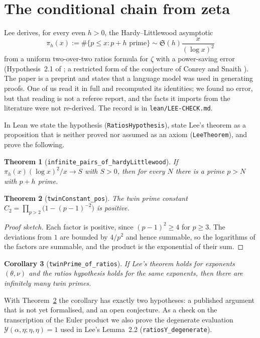 \documentclass[11pt]{article}
\newtheorem{theorem}{Theorem}
\newtheorem{corollary}[theorem]{Corollary}
\theoremstyle{definition}
\theoremstyle{remark}
\newcommand{\lean}[1]{\texttt{#1}}
\begin{document}
\section{The conditional chain from zeta}\label{sec:chain}

Lee \cite{lee} derives, for every even $h>0$, the Hardy--Littlewood asymptotic
\[
\pi_h(x):=\#\{p\le x: p+h \text{ prime}\}\sim\mathfrak{S}(h)\frac{x}{(\log x)^2}
\]
from a uniform two-over-two ratios formula for $\zeta$ with a power-saving
error (Hypothesis~2.1 of \cite{lee}; a restricted form of the conjecture of
Conrey and Snaith \cite{conreysnaith}). The paper is a preprint and states that
a language model was used in generating proofs. One of us read it in full and
recomputed its identities; we found no error, but that reading is not a referee
report, and the facts it imports from the literature were not re-derived. The
record is in \lean{lean/LEE-CHECK.md}.

In Lean we state the hypothesis (\lean{RatiosHypothesis}), state Lee's theorem
as a proposition that is neither proved nor assumed as an axiom
(\lean{LeeTheorem}), and prove the following.

\begin{theorem}[\lean{infinite\_pairs\_of\_hardyLittlewood}]
If $\pi_h(x)(\log x)^2/x\to S$ with $S>0$, then for every $N$ there is a prime
$p>N$ with $p+h$ prime.
\end{theorem}

\begin{theorem}[\lean{twinConstant\_pos}]\label{thm:c2}
The twin prime constant $C_2=\prod_{p>2}\bigl(1-(p-1)^{-2}\bigr)$ is positive.
\end{theorem}

\begin{proof}[Proof sketch]
Each factor is positive, since $(p-1)^2\ge4$ for $p\ge3$. The deviations from
$1$ are bounded by $4/p^2$ and hence summable, so the logarithms of the factors
are summable, and the product is the exponential of their sum.
\end{proof}

\begin{corollary}[\lean{twinPrime\_of\_ratios}]
If Lee's theorem holds for exponents $(\theta,\nu)$ and the ratios hypothesis
holds for the same exponents, then there are infinitely many twin primes.
\end{corollary}

With Theorem~\ref{thm:c2} the corollary has exactly two hypotheses: a published
argument that is not yet formalised, and an open conjecture. As a check on the
transcription of the Euler product we also prove the degenerate evaluation
$\mathcal{Y}(\alpha,\eta;\eta,\eta)=1$ used in Lee's Lemma~2.2
(\lean{ratiosY\_degenerate}).
\end{document}
